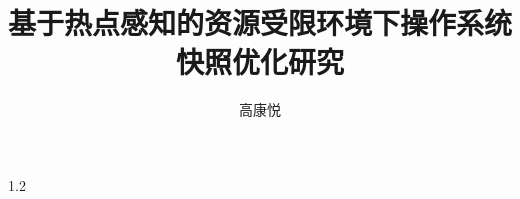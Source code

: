 \documentclass[master,oneside,AutoFakeBold,nocpsupervisor]{zjuthesis} %
\title{基于热点感知的资源受限环境下操作系统快照优化研究} %
\author{高康悦}
\institute{软件学院}         %
\begin{document}
\maketitle

\abstractmatter



\frontmatter
\begin{spacing}{1.2}
       \tableofcontents %
       \listoffigures   %
       \listoftables    %
\end{spacing}

%

\mainmatter







\backmatter








% 
\end{document}
